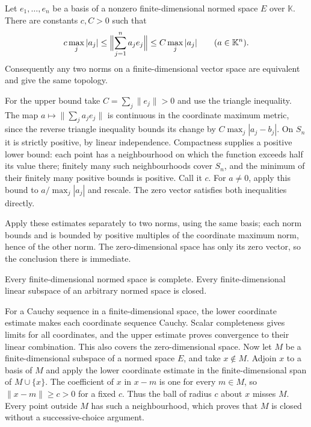 \begin{theorem}
\label{thm:finite_dimensional_norms}
Let $e_1,\ldots,e_n$ be a basis of a nonzero finite-dimensional normed
space $E$ over $\mathbb K$. There are constants $c,C>0$ such that
\[
c\max_j|a_j|\leq\Bigl\|\sum_{j=1}^n a_je_j\Bigr\|
\leq C\max_j|a_j|\qquad(a\in\mathbb K^n).
\]
Consequently any two norms on a finite-dimensional vector space are
equivalent and give the same topology.
\end{theorem}
\Proof
For the upper bound take $C=\sum_j\|e_j\|>0$ and use the triangle
inequality. The map $a\mapsto\|\sum_j a_je_j\|$ is continuous in the
coordinate maximum metric, since the reverse triangle inequality bounds
its change by $C\max_j|a_j-b_j|$. On $S_n$ it is strictly positive,
by linear independence. Compactness supplies a positive lower bound:
each point has a neighbourhood on which the function exceeds half its
value there; finitely many such neighbourhoods cover $S_n$, and the
minimum of their finitely many positive bounds is positive. Call it $c$.
For $a\ne0$, apply this bound to $a/\max_j|a_j|$ and rescale. The
zero vector satisfies both inequalities directly.

Apply these estimates separately to two norms, using the same basis;
each norm bounds and is bounded by positive multiples of the coordinate
maximum norm, hence of the other norm. The zero-dimensional space has
only its zero vector, so the conclusion there is immediate.
\Done

\begin{corollary}
Every finite-dimensional normed space is complete. Every finite-dimensional
linear subspace of an arbitrary normed space is closed.
\end{corollary}
\Proof
For a Cauchy sequence in a finite-dimensional space, the lower coordinate
estimate makes each coordinate sequence Cauchy. Scalar completeness gives
limits for all coordinates, and the upper estimate proves convergence to
their linear combination. This also covers the zero-dimensional space.
Now let $M$ be a finite-dimensional subspace of a normed space $E$,
and take $x\notin M$. Adjoin $x$ to a basis of $M$ and apply the lower
coordinate estimate in the finite-dimensional span of $M\cup\{x\}$.
The coefficient of $x$ in $x-m$ is one for every $m\in M$, so
$\|x-m\|\geq c>0$ for a fixed $c$. Thus the ball of radius $c$ about
$x$ misses $M$. Every point outside $M$ has such a neighbourhood,
which proves that $M$ is closed without a successive-choice argument.
\Done

